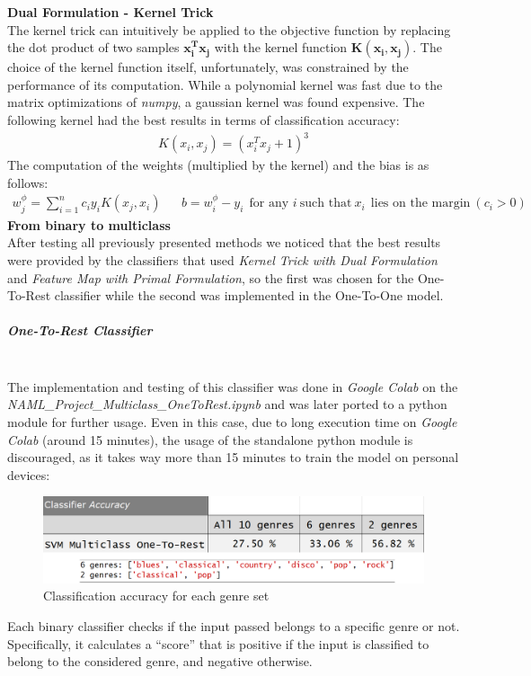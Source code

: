 \documentclass[12pt]{article}
\begin{document}
	\textbf{Dual Formulation - Kernel Trick}\\
	The kernel trick can intuitively be applied to the objective function by replacing the dot product of two samples $\mathbf{x_i^Tx_j}$ with the kernel function $\mathbf{K(x_i,x_j)}$. The choice of the kernel function itself, unfortunately, was constrained by the performance of its computation. While a polynomial kernel was fast due to the matrix optimizations of \textit{numpy}, a gaussian kernel was found expensive. The following kernel had the best results in terms of classification accuracy:
	\begin{align}
		K(x_i,x_j)=(x_i^Tx_j+1)^3
	\end{align}
	The computation of the weights (multiplied by the kernel) and the bias is as follows:
	\begin{align}
		w_j^\phi = \sum_{i=1}^n{c_iy_iK(x_j,x_i)}&&
		b = w^\phi_i-y_i \ \ \text{for any } i\ \text{such that}\ x_i\ \ \text{lies on the margin}\  (c_i>0)
	\end{align}
	\textbf{From binary to multiclass}\\
	After testing all previously presented methods we noticed that the best results were provided by the
	classifiers that used \textit{Kernel Trick with Dual Formulation} and \textit{Feature Map with Primal Formulation}, so the first was chosen for the One-To-Rest classifier while the second was implemented in the One-To-One model.
	\subparagraph{One-To-Rest Classifier}\mbox{}\\\newline
	The implementation and testing of this  classifier was done in \textit{Google Colab} on the\\ \textit{NAML\_Project\_Multiclass\_OneToRest.ipynb} and was later ported to a python module for further usage.
	Even in this case, due to long execution
	time on \textit{Google Colab} (around 15 minutes), the usage of the standalone python module is discouraged, as it takes way more than 15 minutes to train the model on personal devices:
	\begin{figure}[H]
		\hspace{75pt}\includegraphics[scale=0.45]{svm_otr_acc}
		\caption{Classification accuracy for each genre set}
	\end{figure}
	Each binary classifier checks if the input passed belongs to a specific genre or not. Specifically, it calculates a “score” that is positive if the input is classified to belong to the considered genre, and negative otherwise.
	
\end{document}
